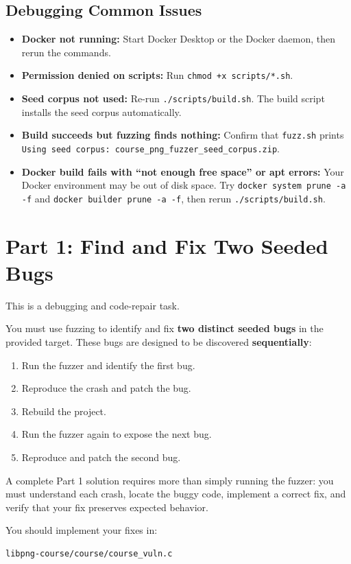 \documentclass[11pt]{article}
\begin{document}
\subsection*{Debugging Common Issues}
\begin{itemize}
    \item \textbf{Docker not running:} Start Docker Desktop or the Docker daemon, then rerun the commands.
    \item \textbf{Permission denied on scripts:} Run \texttt{chmod +x scripts/*.sh}.
    \item \textbf{Seed corpus not used:} Re-run \texttt{./scripts/build.sh}. The build script installs the seed corpus automatically.
    \item \textbf{Build succeeds but fuzzing finds nothing:} Confirm that \texttt{fuzz.sh} prints \texttt{Using seed corpus: course\_png\_fuzzer\_seed\_corpus.zip}.
    \item \textbf{Docker build fails with ``not enough free space'' or apt errors:} Your Docker environment may be out of disk space. Try \texttt{docker system prune -a -f} and \texttt{docker builder prune -a -f}, then rerun \texttt{./scripts/build.sh}.
\end{itemize}

\section*{Part 1: Find and Fix Two Seeded Bugs}
This is a debugging and code-repair task.

You must use fuzzing to identify and fix \textbf{two distinct seeded bugs} in the provided target. These bugs are designed to be discovered \textbf{sequentially}:
\begin{enumerate}
    \item Run the fuzzer and identify the first bug.
    \item Reproduce the crash and patch the bug.
    \item Rebuild the project.
    \item Run the fuzzer again to expose the next bug.
    \item Reproduce and patch the second bug.
\end{enumerate}

A complete Part 1 solution requires more than simply running the fuzzer: you must understand each crash, locate the buggy code, implement a correct fix, and verify that your fix preserves expected behavior.

You should implement your fixes in:
\begin{lstlisting}[style=bashstyle]
libpng-course/course/course_vuln.c
\end{lstlisting}
\end{document}
